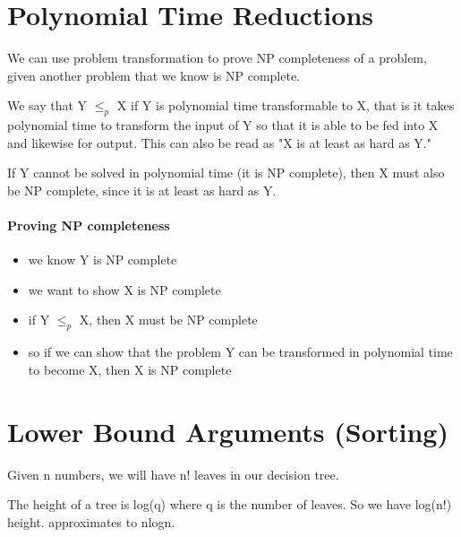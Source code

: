 \section{Polynomial Time Reductions}
We can use problem transformation to prove NP completeness of a problem, given another problem that we know is NP complete.
 
We say that Y $\leq_p$ X if Y is polynomial time transformable to X, that is it takes polynomial time to transform the input of Y so that it is able to be fed into X and likewise for output. This can also be read as "X is at least as hard as Y."
 
If Y cannot be solved in polynomial time (it is NP complete), then X must also be NP complete, since it is at least as hard as Y.

\paragraph{Proving NP completeness}
\begin{itemize}
    \item we know Y is NP complete
    \item we want to show X is NP complete
    \item if Y $\leq_p$ X, then X must be NP complete
    \item so if we can show that the problem Y can be transformed in polynomial time to become X, then X is NP complete
    
\end{itemize}


\section{Lower Bound Arguments (Sorting)}

Given n numbers, we will have n! leaves in our decision tree.
 
The height of a tree is log(q) where q is the number of leaves.
So we have log(n!) height. approximates to nlogn.


